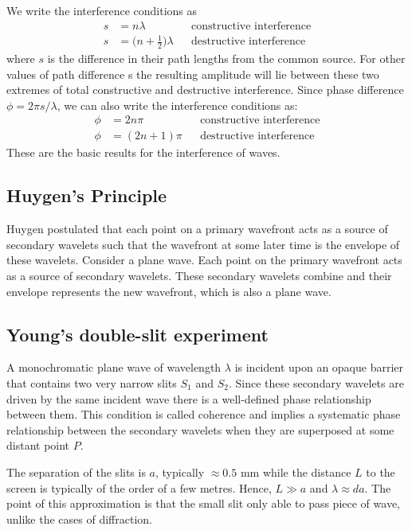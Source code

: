 \documentclass[../../../main.tex]{subfiles}
\begin{document}
We write the interference conditions as
\begin{align*}
    s &= n\lambda &&\text{constructive interference}\\
    s &= \biggl(n+\frac{1}{2}\biggr)\lambda&&\text{destructive interference}
\end{align*}
where $s$ is the difference in their path lengths from the common source. For other values of path difference s the resulting amplitude will lie between these two extremes of total constructive and destructive interference. Since phase difference $\phi=2\pi s/\lambda$, we can also write the interference conditions as:
\begin{align*}
    \phi &= 2n\pi &&\text{constructive interference}\\
    \phi &= (2n+1)\pi&&\text{destructive interference}
\end{align*}
These are the basic results for the interference of waves.

\subsection{Huygen's Principle}
Huygen postulated that each point on a primary wavefront acts as a source of secondary wavelets such that the wavefront at some later time is the envelope of these wavelets. Consider a plane wave. Each point on the primary wavefront acts as a source of secondary wavelets. These secondary wavelets combine and their envelope represents the new wavefront, which is also a plane wave.

\begin{figure*}[h]
    \centering
\end{figure*}


\subsection{Young's double-slit experiment}
A monochromatic plane wave of wavelength $\lambda$ is incident upon an opaque barrier that contains two very narrow slits $S_1$ and $S_2$. Since these secondary wavelets are driven by the same incident wave there is a well-defined phase relationship between them. This condition is called coherence and implies a systematic phase relationship between the secondary wavelets when they are superposed at some distant point $P$. 

The separation of the slits is $a$, typically $\approx0.5$ mm while the 
distance $L$ to the screen is typically of the order of a few metres. Hence, $L \gg a$ and $\lambda\approx da$. The point of this approximation is that the small slit only able to pass piece of wave, unlike the cases of diffraction.
\end{document}
